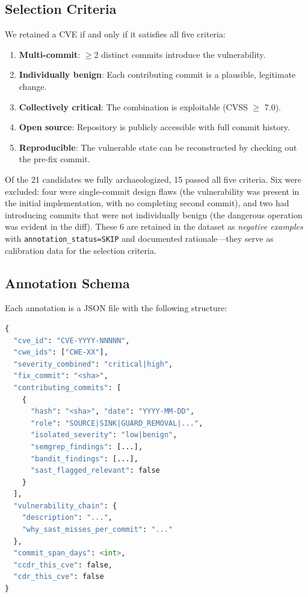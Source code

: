 \documentclass[sigconf,review]{acmart}
\begin{document}
\subsection{Selection Criteria}

We retained a CVE if and only if it satisfies all five criteria:
\begin{enumerate}
  \item \textbf{Multi-commit}: $\geq$2 distinct commits introduce the vulnerability.
  \item \textbf{Individually benign}: Each contributing commit is a plausible, legitimate change.
  \item \textbf{Collectively critical}: The combination is exploitable (CVSS $\geq$ 7.0).
  \item \textbf{Open source}: Repository is publicly accessible with full commit history.
  \item \textbf{Reproducible}: The vulnerable state can be reconstructed by checking out the
        pre-fix commit.
\end{enumerate}
Of the 21 candidates we fully archaeologized, 15 passed all five criteria. Six were
excluded: four were single-commit design flaws (the vulnerability was present in the
initial implementation, with no completing second commit), and two had introducing
commits that were not individually benign (the dangerous operation was evident in the diff).
These 6 are retained in the dataset as \emph{negative examples} with \texttt{annotation\_status=SKIP}
and documented rationale—they serve as calibration data for the selection criteria.

\subsection{Annotation Schema}

Each annotation is a JSON file with the following structure:

\begin{lstlisting}[language=Python]
{
  "cve_id": "CVE-YYYY-NNNNN",
  "cwe_ids": ["CWE-XX"],
  "severity_combined": "critical|high",
  "fix_commit": "<sha>",
  "contributing_commits": [
    {
      "hash": "<sha>", "date": "YYYY-MM-DD",
      "role": "SOURCE|SINK|GUARD_REMOVAL|...",
      "isolated_severity": "low|benign",
      "semgrep_findings": [...],
      "bandit_findings": [...],
      "sast_flagged_relevant": false
    }
  ],
  "vulnerability_chain": {
    "description": "...",
    "why_sast_misses_per_commit": "..."
  },
  "commit_span_days": <int>,
  "ccdr_this_cve": false,
  "cdr_this_cve": false
}
\end{lstlisting}
\end{document}
